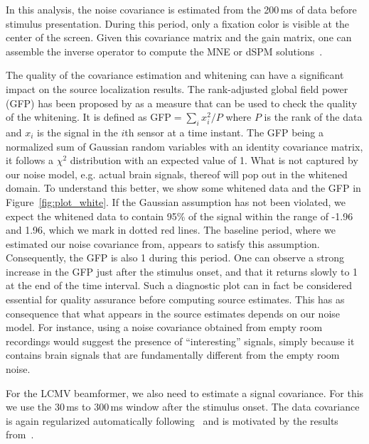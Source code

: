In this analysis, the noise covariance is estimated from the 200\,ms of data before stimulus presentation. During this period, only a fixation color is visible at the center of the screen. Given this covariance matrix and the gain matrix, one can assemble the inverse operator to compute the MNE or dSPM solutions~\citep{dspm}.

The quality of the covariance estimation and whitening can have a significant impact on the source localization results. The rank-adjusted global field power (GFP) has been proposed by \citet{engemann2015automated} as a measure that can be used to check the quality of the whitening. It is defined as GFP$=\sum_i x^2_{i} / P$ where $P$ is the rank of the data and $x_i$ is the signal in the $i$th sensor at a time instant. The GFP being a normalized sum of Gaussian random variables with an identity covariance matrix, it follows a $\chi^2$ distribution with an expected value of 1. What is not captured by our noise model, e.g. actual brain signals, thereof will pop out in the whitened domain.
To understand this better, we show some whitened data and the GFP in Figure~\ref{fig:plot_white}. If the Gaussian assumption has not been violated, we expect the whitened data to contain 95\% of the signal within the range of -1.96 and 1.96, which we mark in dotted red lines. The baseline period, where we estimated our noise covariance from, appears to satisfy this assumption. Consequently, the GFP is also 1 during this period. One can observe a strong increase in the GFP just after the stimulus onset, and that it returns slowly to 1 at the end of the time interval. Such a diagnostic plot can in fact be considered essential for quality assurance before computing source estimates. This has as consequence that what appears in the source estimates depends on our noise model. For instance, using a noise covariance obtained from empty room recordings would suggest the presence of ``interesting'' signals, simply because it contains brain signals that are fundamentally different from the empty room noise.

For the LCMV beamformer, we also need to estimate a signal covariance. For this we use the 30\,ms to 300\,ms window after the stimulus onset. The data covariance is again regularized automatically following~\citep{engemann2015automated} and is motivated by the results from~\citep{Woolrich:2011,MindTheCov}.

